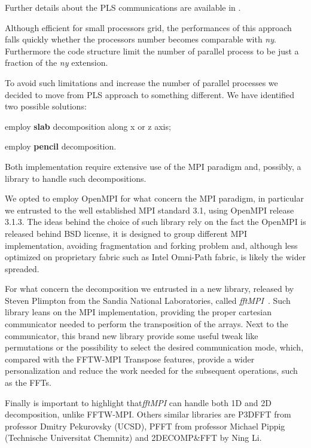 Further details about the PLS communications are available in \cite[\nopp chapter 4.2]{ns:quadrio}. \\
 \par
Although efficient for small processors grid, the performances of this approach falls quickly whether the processors number becomes comparable with \emph{ny}.  Furthermore the code structure limit the number of parallel process to be just a fraction of the \emph{ny} extension. \\
\par
To avoid such limitations and increase the number of parallel processes we decided to move from PLS approach to something different.
We have identified two possible solutions:
\begin{description}
  \item employ \textbf{slab} decomposition along x or z axis;
  \item employ \textbf{pencil} decomposition.
\end{description}
Both implementation require extensive use of the MPI paradigm and, possibly, a library to handle such decompositions.
\par
We opted to employ OpenMPI\cite{openmpi} for what concern the MPI paradigm, in particular we entrusted to the well established MPI standard 3.1\cite{MPI:standard}, using OpenMPI release 3.1.3.
The ideas behind the choice of such library rely on the fact the OpenMPI is released behind BSD license\cite{bsd:license}, it is designed to group different MPI implementation, avoiding fragmentation and forking problem\cite{faq:openmpi} and, although less optimized on proprietary fabric such as Intel Omni-Path fabric\cite{intel:omnipath}\cite{intel:intelmpivsopenmpi}, is likely the wider spreaded.
\par
For what concern the decomposition we entrusted in a new library, released by Steven Plimpton from the Sandia National Laboratories, called \emph{fftMPI}~\cite{fftMPI}. Such library leans on the MPI implementation, providing the proper cartesian communicator needed to perform the transposition of the arrays. Next to the communicator, this brand new library provide some useful tweak like permutations or the possibility to select the desired communication mode, which, compared with the FFTW-MPI Transpose\cite{FFTW05}\cite{FFTW:transpose} features, provide a wider personalization and reduce the work needed for the subsequent operations, such as the FFTs. 
\par
Finally is important to highlight that\emph{fftMPI} can handle both 1D and 2D decomposition, unlike FFTW-MPI.
Others similar libraries are P3DFFT\cite{p3dfft} from professor Dmitry Pekurovsky (UCSD), PFFT from professor Michael Pippig\cite{pfft} (Technische Universitat Chemnitz) and 2DECOMP\&FFT\cite{2decomp} by Ning Li.

